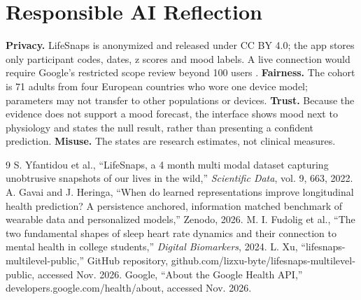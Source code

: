 \documentclass[10pt,twocolumn]{article}
\begin{document}
\section{Responsible AI Reflection}
\textbf{Privacy.} LifeSnaps is anonymized and released under CC BY 4.0; the app stores only participant codes, dates, z scores and mood labels. A live connection would require Google's restricted scope review beyond 100 users \cite{ghapi}. \textbf{Fairness.} The cohort is 71 adults from four European countries who wore one device model; parameters may not transfer to other populations or devices. \textbf{Trust.} Because the evidence does not support a mood forecast, the interface shows mood next to physiology and states the null result, rather than presenting a confident prediction. \textbf{Misuse.} The states are research estimates, not clinical measures.

\begin{thebibliography}{9}\small
{} S. Yfantidou et al., ``LifeSnaps, a 4 month multi modal dataset capturing unobtrusive snapshots of our lives in the wild,'' \emph{Scientific Data}, vol. 9, 663, 2022.
 A. Gavai and J. Heringa, ``When do learned representations improve longitudinal health prediction? A persistence anchored, information matched benchmark of wearable data and personalized models,'' Zenodo, 2026.
 M. I. Fudolig et al., ``The two fundamental shapes of sleep heart rate dynamics and their connection to mental health in college students,'' \emph{Digital Biomarkers}, 2024.
 L. Xu, ``lifesnaps-multilevel-public,'' GitHub repository, github.com/lizxu-byte/lifesnaps-multilevel-public, accessed Nov. 2026.
 Google, ``About the Google Health API,'' developers.google.com/health/about, accessed Nov. 2026.
\end{thebibliography}
\end{document}
